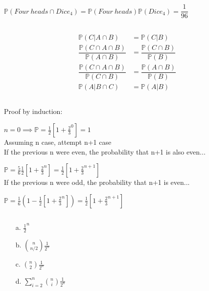 \documentclass{article}
\begin{document}
\subsection{}

\( \mathbb{P}(Four~heads \cap Dice_4) = \mathbb{P}(Four~heads)\mathbb{P}(Dice_4) = \dfrac{1}{96} \)

\subsection{}
\begin{align*}
\mathbb{P}(C | A \cap B) &= \mathbb{P}(C | B) \\
\dfrac{\mathbb{P}(C \cap A \cap B)}{\mathbb{P}(A \cap B)} &= \dfrac{\mathbb{P}(C \cap B)}{\mathbb{P}(B)}\\
\dfrac{\mathbb{P}(C \cap A \cap B)}{\mathbb{P}(C \cap B)} &= \dfrac{\mathbb{P}(A \cap B)}{\mathbb{P}(B)}\\
\mathbb{P}(A | B \cap C) &= \mathbb{P}(A | B)
\end{align*}

\subsection{}
Proof by induction:

\( n = 0 \implies \mathbb{P} = \frac{1}{2} [1+\frac{2}{3}^0] = 1 \)
\\
Assuming n case, attempt n+1 case \\
If the previous n were even, the probability that n+1 is also even...

\( \mathbb{P} = \frac{5}{6} \frac{1}{2} [1+\frac{2}{3}^n] = \frac{1}{2} [1+\frac{2}{3}^{n+1}] \)
\\
If the previous n were odd, the probability that n+1 is even...

\( \mathbb{P} = \frac{1}{6} (1 - \frac{1}{2} [1+\frac{2}{3}^n]) = \frac{1}{2} [1+\frac{2}{3}^{n+1}] \)

\subsection{}

\begin{enumerate}
    \item[a.] \( \frac{1}{2}^n \)
    \item[b.] \( \binom{n}{n/2} \frac{1}{2^n} \)
    \item[c.] \( \binom{n}{2} \frac{1}{2^n} \)
    \item[d.] \( \sum\limits_{i=2}^n \binom{n}{i} \frac{1}{2^n} \)
\end{enumerate}
\end{document}
